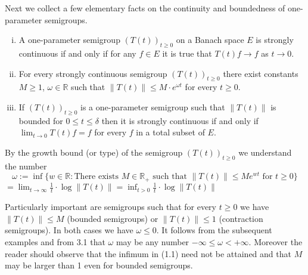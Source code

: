 Next we collect a few elementary facts on the continuity and boundedness of one-parameter semigroups.
\begin{remark}
\begin{enumerate}[(i)]
\item
A one-parameter semigroup $(T(t))_{t \geq 0}$ on a Banach space $E$ is strongly continuous if and only if for any $f \in E$ it is true that $T(t)f \to f$ as $t \to 0$.

\item
For every strongly continuous semigroup $(T(t))_{t \geq 0}$ there exist constants $M \geq 1$, $\omega \in \mathbb{R}$ such that $\|T(t)\| \leq M \cdot e^{\omega t}$ for every $t \geq 0$.

\item
If $(T(t))_{t \geq 0}$ is a one-parameter semigroup such that $\|T(t)\|$ is bounded for $0 \leq t \leq \delta$ then it is strongly continuous if and only if $\lim_{t \to 0} T(t)f = f$ for every $f$ in a total subset of $E$.

\end{enumerate}
\end{remark}
\begin{definition}
By the growth bound (or type) of the semigroup $(T(t))_{t \geq 0}$ we understand the number
\begin{equation}
\omega := \inf\{w \in \mathbb{R}: \text{There exists } M \in \mathbb{R}_{+} \text{ such that } \|T(t)\| \leq M e^{wt} \text{ for } t \geq 0\}
\end{equation}
$= \lim_{t \to \infty} \frac{1}{t} \cdot \log\|T(t)\| = \inf_{t > 0} \frac{1}{t} \cdot \log\|T(t)\|$
\end{definition}
Particularly important are semigroups such that for every $t \geq 0$ we have $\|T(t)\| \leq M$ (bounded semigroups) or $\|T(t)\| \leq 1$ (contraction semigroups).
In both cases we have $\omega \leq 0$.
It follows from the subsequent examples and from 3.1 that $\omega$ may be any number $-\infty \leq \omega < +\infty$.
Moreover the reader should observe that the infimum in (1.1) need not be attained and that $M$ may be larger than 1 even for bounded semigroups.
